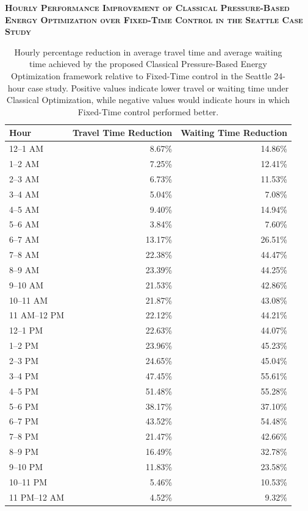 \documentclass[12pt]{article}
\begin{document}
\begin{table}[H]
\centering
\textbf{\textsc{Hourly Performance Improvement of Classical Pressure-Based Energy Optimization over Fixed-Time Control in the Seattle Case Study}}

\vspace{0.3cm}

\begin{tabular}{@{} l r r @{}}
\toprule
\textbf{Hour} & \textbf{Travel Time Reduction} & \textbf{Waiting Time Reduction} \\
\midrule
12--1 AM & 8.67\%  & 14.86\% \\
1--2 AM & 7.25\%  & 12.41\% \\
2--3 AM & 6.73\%  & 11.53\% \\
3--4 AM & 5.04\%  & 7.08\% \\
4--5 AM & 9.40\%  & 14.94\% \\
5--6 AM & 3.84\%  & 7.60\% \\
6--7 AM & 13.17\% & 26.51\% \\
7--8 AM & 22.38\% & 44.47\% \\
8--9 AM & 23.39\% & 44.25\% \\
9--10 AM & 21.53\% & 42.86\% \\
10--11 AM & 21.87\% & 43.08\% \\
11 AM--12 PM & 22.12\% & 44.21\% \\
12--1 PM & 22.63\% & 44.07\% \\
1--2 PM & 23.96\% & 45.23\% \\
2--3 PM & 24.65\% & 45.04\% \\
3--4 PM & 47.45\% & 55.61\% \\
4--5 PM & 51.48\% & 55.28\% \\
5--6 PM & 38.17\% & 37.10\% \\
6--7 PM & 43.52\% & 54.48\% \\
7--8 PM & 21.47\% & 42.66\% \\
8--9 PM & 16.49\% & 32.78\% \\
9--10 PM & 11.83\% & 23.58\% \\
10--11 PM & 5.46\% & 10.53\% \\
11 PM--12 AM & 4.52\% & 9.32\% \\
\bottomrule
\end{tabular}

\caption{Hourly percentage reduction in average travel time and average waiting time achieved by the proposed Classical Pressure-Based Energy Optimization framework relative to Fixed-Time control in the Seattle 24-hour case study. Positive values indicate lower travel or waiting time under Classical Optimization, while negative values would indicate hours in which Fixed-Time control performed better.}
\label{tab:seattle-fixed-vs-classical-hourly-percent-table}
\end{table}
\end{document}
